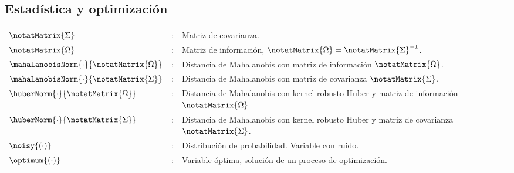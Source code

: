 \begin{notation}
\section*{Estadística y optimización}
\begin{center}
	\begin{tabular}{l c p{12cm}}
		$\notatMatrix{\Sigma}$							& : & Matriz de covarianza.
		\\
		$\notatMatrix{\Omega}$							& : & Matriz de información, $\notatMatrix{\Omega} = \notatMatrix{\Sigma}^{-1}$.
		\\
		$\mahalanobisNorm{\cdot}{\notatMatrix{\Omega}}$	& : & Distancia de Mahalanobis con matriz de información $\notatMatrix{\Omega}$.
		\\
		$\mahalanobisNorm{\cdot}{\notatMatrix{\Sigma}}$	& : & Distancia de Mahalanobis con matriz de covarianza $\notatMatrix{\Sigma}$.
		\\
		$\huberNorm{\cdot}{\notatMatrix{\Omega}}$		& : & Distancia de Mahalanobis con kernel robusto Huber y matriz de información $\notatMatrix{\Omega}$		
		\\
		$\huberNorm{\cdot}{\notatMatrix{\Sigma}}$		& : & Distancia de Mahalanobis con kernel robusto Huber y matriz de covarianza $\notatMatrix{\Sigma}$.
		\\
		$\noisy{\left(\cdot\right)}$			& : & Distribución de probabilidad. Variable con ruido.
		\\
		$\optimum{\left(\cdot\right)}$			& : & Variable óptima, solución de un proceso de optimización.
	\end{tabular} 
\end{center}


\end{notation}
